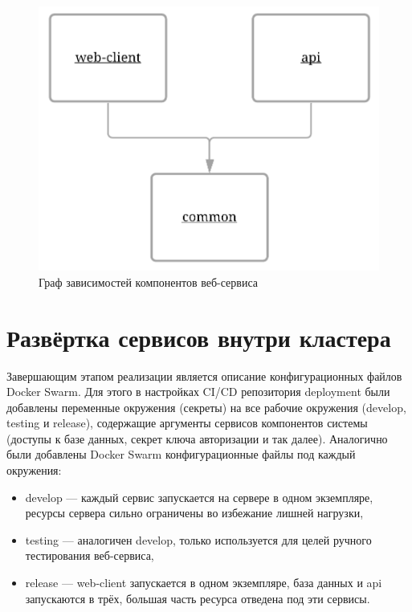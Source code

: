 \begin{figure}[ht]
    \centering
    \includegraphics[scale=0.4]{src/figures/dependency-graph}
    \caption{Граф зависимостей компонентов веб-сервиса}
    \label{fig:dependency-graph}
\end{figure}

\section{Развёртка сервисов внутри кластера}

Завершающим этапом реализации является описание конфигурационных файлов Docker Swarm.
Для этого в настройках CI/CD репозитория deployment были добавлены переменные окружения (секреты) на все рабочие окружения (develop, testing и release),
содержащие аргументы сервисов компонентов системы (доступы к базе данных, секрет ключа авторизации и так далее)\cite{kuberForDevOps}.
Аналогично были добавлены Docker Swarm конфигурационные файлы под каждый окружения:

\begin{itemize}
    \item develop --- каждый сервис запускается на сервере в одном экземпляре, ресурсы сервера сильно ограничены во избежание лишней нагрузки,
    \item testing --- аналогичен develop, только используется для целей ручного тестирования веб-сервиса,
    \item release --- web-client запускается в одном экземпляре, база данных и api запускаются в трёх, большая часть ресурса отведена под эти сервисы.
\end{itemize}

